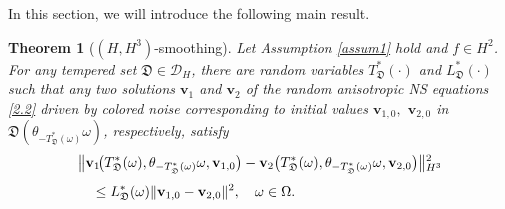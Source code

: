 \documentclass{elsarticle}
\newtheorem{theorem}{Theorem}[section]
\theoremstyle{definition}
\numberwithin{equation}{section}
\newcommand{\D}{\mathcal{D}}
\begin{document}
In this section, we will introduce the following main result.
\begin{theorem}[$(H, H^3)$-smoothing] \label{theorem7.1}
 Let Assumption \ref{assum1} hold and $f\in H^2$. For   any tempered set $\mathfrak D \in \D_H$, there
  are  random variables $T_{{\mathfrak D}}^* (\cdot)  $   and $ L_{\mathfrak D}^*(\cdot )$ such that  any two solutions $\textbf{v}_1$ and $\textbf{v}_2$ of the random anisotropic  NS equations \eqref{2.2} driven by colored noise corresponding to initial values   $\textbf{v}_{1,0},$ $ \textbf{v}_{2,0}$ in $\mathfrak D \left (\theta_{-T_{\mathfrak D}^*(\omega)}\omega \right)$, respectively, satisfy
  \begin{align}
  &
  \big\|\textbf{v}_1 \!  \big (T_{\mathfrak D}^*(\omega),\theta_{-T_{\mathfrak D}^*(\omega)}\omega,\textbf{v}_{1,0}\big)
  -\textbf{v}_2 \big (T_{\mathfrak D}^*(\omega),\theta_{-T_{\mathfrak D}^*(\omega)}\omega,\textbf{v}_{2,0} \big) \big \|{^2_{H^3}}  \notag \\[0.8ex]
&\quad \leq  L_{\mathfrak D}^* (\omega)\|\textbf{v}_{1,0}-\textbf{v}_{2,0}\|^2,\quad \omega\in \Omega.\label{sep5.1}
\end{align}
\end{theorem}
\end{document}

